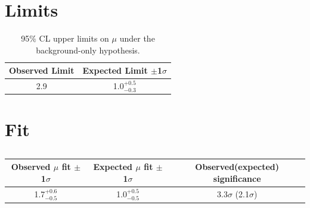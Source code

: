 





\section{Limits}

\begin{table}[htbp]
\begin{center}
  \caption[Table of Final Limits]{95$\%$ CL upper limits on $\mu$ under the background-only hypothesis.}
    \begin{tabular}{c c} \hline
      Observed Limit & Expected Limit $\pm$1$\sigma$  \\ \hline 
      2.9 & 1.0$^{+0.5}_{-0.3}$  \\
      \hline
    \end{tabular}
    \label{tab:limits}
\end{center}
\end{table}

\section{Fit}

\begin{table}[htbp]
\begin{center}
  \caption[Table of best-fit signal strength]{}
    \begin{tabular}{c c c} \hline
      Observed $\mu$ fit $\pm$1$\sigma$ & Expected $\mu$ fit $\pm$1$\sigma$ & Observed(expected) significance & \\ \hline 
      1.7$^{+0.6}_{-0.5}$ & 1.0$^{+0.5}_{-0.5}$ & 3.3$\sigma$ (2.1$\sigma$)  \\
      \hline
    \end{tabular}
    \label{tab:mu}
\end{center}
\end{table}


